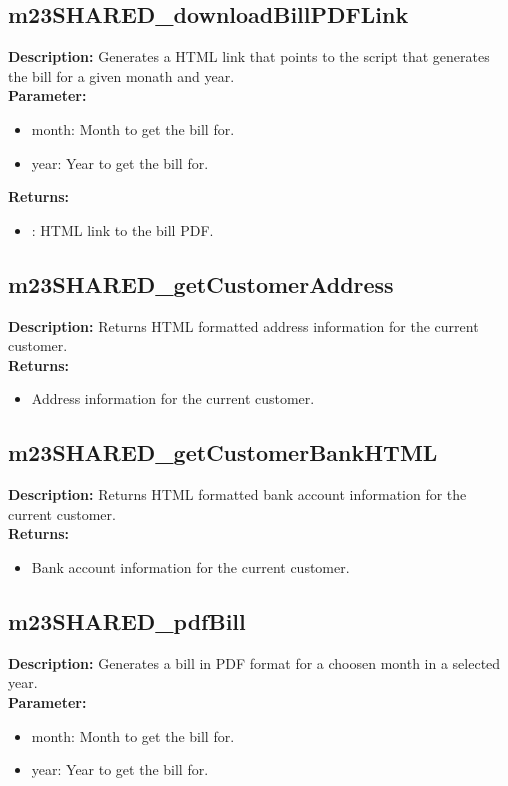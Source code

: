 \subsection{m23SHARED\_downloadBillPDFLink}
\textbf{Description:} Generates a HTML link that points to the script that generates the bill for a given monath and year.\\
\textbf{Parameter:}
\begin{itemize}
\item month: Month to get the bill for.
\item year: Year to get the bill for.
\end{itemize}
\textbf{Returns:}
\begin{itemize}
\item : HTML link to the bill PDF.
\end{itemize}

\subsection{m23SHARED\_getCustomerAddress}
\textbf{Description:} Returns HTML formatted address information for the current customer.\\
\textbf{Returns:}
\begin{itemize}
\item Address information for the current customer.
\end{itemize}

\subsection{m23SHARED\_getCustomerBankHTML}
\textbf{Description:} Returns HTML formatted bank account information for the current customer.\\
\textbf{Returns:}
\begin{itemize}
\item Bank account information for the current customer.
\end{itemize}

\subsection{m23SHARED\_pdfBill}
\textbf{Description:} Generates a bill in PDF format for a choosen month in a selected year.\\
\textbf{Parameter:}
\begin{itemize}
\item month: Month to get the bill for.
\item year: Year to get the bill for.
\end{itemize}

